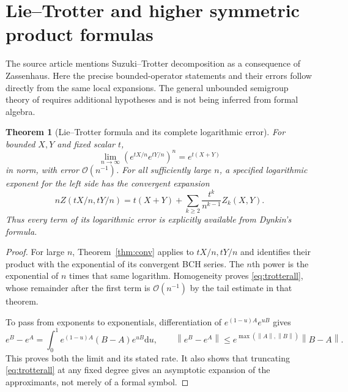 \documentclass[11pt]{article}
\newtheorem{theorem}{Theorem}[section]
\theoremstyle{definition}
\theoremstyle{remark}
\newcommand{\dd}{\mathrm d}
\newcommand{\norm}[1]{\left\lVert #1\right\rVert}
\newcommand{\smallO}{\mathcal O}
\numberwithin{equation}{section}
\begin{document}
\section{Lie--Trotter and higher symmetric product formulas}\label{sec:trotter}
The source article mentions Suzuki--Trotter decomposition as a consequence of Zassenhaus. Here the precise bounded-operator statements and their errors follow directly from the same local expansions. The general unbounded semigroup theory of \cite{trotter} requires additional hypotheses and is not being inferred from formal algebra.
\begin{theorem}[Lie--Trotter formula and its complete logarithmic error]\label{thm:trotter}
For bounded $X,Y$ and fixed scalar $t$,
\begin{equation}\label{eq:trotter}
 \lim_{n\to\infty}(e^{tX/n}e^{tY/n})^n=e^{t(X+Y)}
\end{equation}
in norm, with error $\smallO(n^{-1})$. For all sufficiently large $n$, a specified logarithmic exponent for the left side has the convergent expansion
\begin{equation}\label{eq:trotterall}
 nZ(tX/n,tY/n)=t(X+Y)+
                   \sum_{k\geq2}\frac{t^k}{n^{k-1}}Z_k(X,Y).
\end{equation}
Thus every term of its logarithmic error is explicitly available from Dynkin's formula.
\end{theorem}
\begin{proof}
For large $n$, Theorem~\ref{thm:conv} applies to $tX/n,tY/n$ and identifies their product with the exponential of its convergent BCH series. The $n$th power is the exponential of $n$ times that same logarithm. Homogeneity proves \eqref{eq:trotterall}, whose remainder after the first term is $\smallO(n^{-1})$ by the tail estimate in that theorem.

To pass from exponents to exponentials, differentiation of
$e^{(1-u)A}e^{uB}$ gives
\[
 e^B-e^A=\int_0^1e^{(1-u)A}(B-A)e^{uB}\dd u,
 \qquad
 \norm{e^B-e^A}\leq e^{\max(\norm A,\norm B)}\norm{B-A}.
\]
This proves both the limit and its stated rate. It also shows that truncating \eqref{eq:trotterall} at any fixed degree gives an asymptotic expansion of the approximants, not merely of a formal symbol.
\end{proof}
\end{document}
